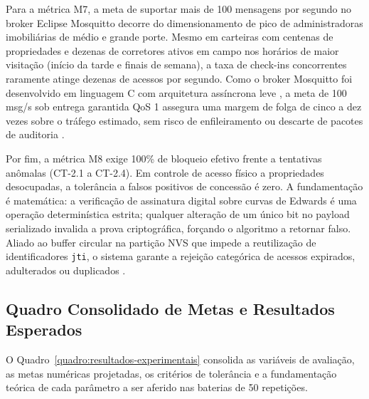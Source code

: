 Para a métrica M7, a meta de suportar mais de 100 mensagens por segundo no broker Eclipse Mosquitto decorre do dimensionamento de pico de administradoras imobiliárias de médio e grande porte. Mesmo em carteiras com centenas de propriedades e dezenas de corretores ativos em campo nos horários de maior visitação (início da tarde e finais de semana), a taxa de check-ins concorrentes raramente atinge dezenas de acessos por segundo. Como o broker Mosquitto foi desenvolvido em linguagem C com arquitetura assíncrona leve \cite{shauto2024}, a meta de 100 msg/s sob entrega garantida QoS 1 assegura uma margem de folga de cinco a dez vezes sobre o tráfego estimado, sem risco de enfileiramento ou descarte de pacotes de auditoria \cite{ameer2022}.

Por fim, a métrica M8 exige 100\% de bloqueio efetivo frente a tentativas anômalas (CT-2.1 a CT-2.4). Em controle de acesso físico a propriedades desocupadas, a tolerância a falsos positivos de concessão é zero. A fundamentação é matemática: a verificação de assinatura digital sobre curvas de Edwards é uma operação determinística estrita; qualquer alteração de um único bit no payload serializado invalida a prova criptográfica, forçando o algoritmo a retornar falso. Aliado ao buffer circular na partição NVS que impede a reutilização de identificadores \texttt{jti}, o sistema garante a rejeição categórica de acessos expirados, adulterados ou duplicados \cite{satanasaowapak2021}.

\subsection{Quadro Consolidado de Metas e Resultados Esperados}
\label{subsec:quadro-consolidado-resultados}

O Quadro~\ref{quadro:resultados-experimentais} consolida as variáveis de avaliação, as metas numéricas projetadas, os critérios de tolerância e a fundamentação teórica de cada parâmetro a ser aferido nas baterias de 50 repetições.


